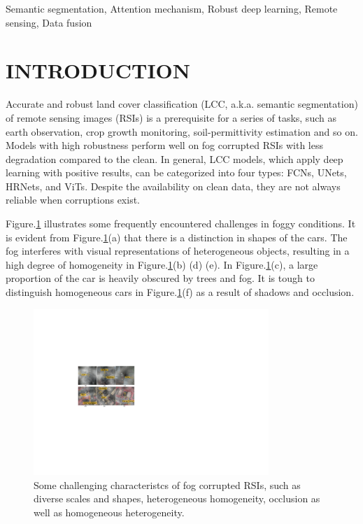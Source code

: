 \documentclass[lettersize,journal]{IEEEtran}
\begin{document}
\begin{IEEEkeywords}
    Semantic segmentation, Attention mechanism, Robust deep learning, Remote sensing, Data fusion
\end{IEEEkeywords}

\section{INTRODUCTION}
Accurate and robust land cover classification (LCC, a.k.a. semantic segmentation) of remote sensing images (RSIs) is a prerequisite for a series of tasks, such as earth observation\cite{Schmitt2019SEN12MSA}, crop growth monitoring\cite{Mandal2020DualPR}, soil-permittivity estimation \cite{Hnsch2021SoilPermittivityEU} and so on. Models with high robustness perform well on fog corrupted RSIs with less degradation compared to the clean. In general, LCC models, which apply deep learning with positive results, can be categorized into four types: FCNs\cite{shelhamerFullyConvolutionalNetworks2017}, UNets\cite{ronnebergerUNetConvolutionalNetworks2015}, HRNets\cite{wangDeepHighResolutionRepresentation2020}, and ViTs\cite{liuSwinTransformerHierarchical2021}. Despite the availability on clean data, they are not always reliable when corruptions exist.

 Figure.\ref{challenges} illustrates some frequently encountered challenges in foggy conditions. It is evident from Figure.\ref{challenges}(a) that there is a distinction in shapes of the cars. The fog interferes with visual representations of heterogeneous objects, resulting in a high degree of homogeneity in Figure.\ref{challenges}(b) (d) (e). In Figure.\ref{challenges}(c), a large proportion of the car is heavily obscured by trees and fog. It is tough to distinguish homogeneous cars in Figure.\ref{challenges}(f) as a result of shadows and occlusion.

\begin{figure}[!htbp]
    \centering
    \includegraphics[width=3.5in]{challenges.pdf}
    \caption{Some challenging characteristcs of fog corrupted RSIs, such as diverse scales and shapes, heterogeneous homogeneity, occlusion as well as homogeneous heterogeneity.
    }
    \label{challenges}
    \vspace{-0.2cm}
\end{figure}
\end{document}
